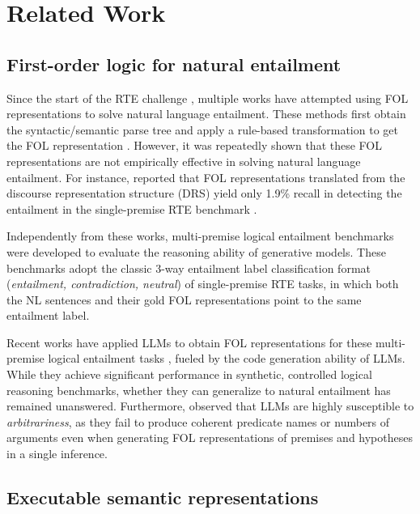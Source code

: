\section{Related Work}

\subsection{First-order logic for natural entailment}

Since the start of the RTE challenge \citep{rte}, multiple works have attempted using FOL representations to solve natural language entailment. These methods first obtain the syntactic/semantic parse tree and apply a rule-based transformation to get the FOL representation \citep{bos-markert-2005-recognising, bos-nli}. However, it was repeatedly shown that these FOL representations are not empirically effective in solving natural language entailment. For instance, \citet{bos-nli} reported that FOL representations translated from the discourse representation structure (DRS) yield only 1.9\% recall in detecting the entailment in the single-premise RTE benchmark \citep{rte}.

Independently from these works, multi-premise logical entailment benchmarks \citep{tafjord-etal-2021-proofwriter, logicnli, folio} were developed to evaluate the reasoning ability of generative models. These benchmarks adopt the classic 3-way entailment label classification format (\textit{entailment, contradiction, neutral}) of single-premise RTE tasks, in which both the NL sentences and their gold FOL representations point to the same entailment label. 

Recent works have applied LLMs to obtain FOL representations for these multi-premise logical entailment tasks \citep{logiclm, linc, divide-and-translate}, fueled by the code generation ability of LLMs. While they achieve significant performance in synthetic, controlled logical reasoning benchmarks, whether they can generalize to natural entailment has remained unanswered. Furthermore, \citet{linc} observed that LLMs are highly susceptible to \textit{arbitrariness}, as they fail to produce coherent predicate names or numbers of arguments even when generating FOL representations of premises and hypotheses in a single inference.

\subsection{Executable semantic representations}

